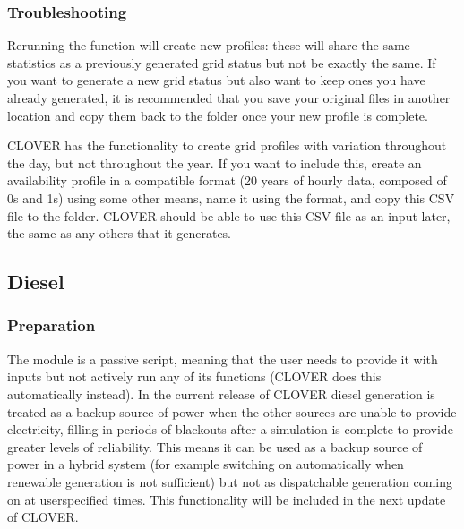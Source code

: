 \documentclass[letterpaper,10pt,english]{sphinxmanual}
\begin{document}
\subsubsection{Troubleshooting}
\label{\detokenize{electricity_generation:id3}}
\sphinxAtStartPar
Rerunning the  function will create
new profiles: these will share the same statistics as a previously
generated grid status but not be exactly the same. If you want to
generate a new grid status but also want to keep ones you have already
generated, it is recommended that you save your original files in
another location and copy them back to the  folder once your new
profile is complete.

\sphinxAtStartPar
CLOVER has the functionality to create grid profiles with variation
throughout the day, but not throughout the year. If you want to include
this, create an availability profile in a compatible format (20 years of
hourly data, composed of 0s and 1s) using some other means, name it
using the format, and copy this CSV file to
the  folder. CLOVER should be able to use this CSV file as an
input later, the same as any others that it generates.


\subsection{Diesel}
\label{\detokenize{electricity_generation:diesel}}

\subsubsection{Preparation}
\label{\detokenize{electricity_generation:id4}}
\sphinxAtStartPar
The  module is a passive script, meaning that the user needs to
provide it with inputs but not actively run any of its functions (CLOVER
does this automatically instead). In the current release of CLOVER
diesel generation is treated as a backup source of power when the other
sources are unable to provide electricity, filling in periods of
blackouts after a simulation is complete to provide greater levels of
reliability. This means it can be used as a backup source of power in a
hybrid system (for example switching on automatically when renewable
generation is not sufficient) but not as dispatchable generation coming
on at user\sphinxhyphen{}specified times. This functionality will be included in the
next update of CLOVER.
\end{document}
